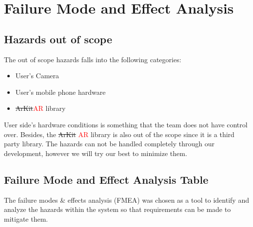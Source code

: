\documentclass{article}
\begin{document}
\section{Failure Mode and Effect Analysis}
\subsection{Hazards out of scope}
The out of scope hazards falls into the following categories:
\begin{itemize}
    \item User's Camera
    \item User's mobile phone hardware
    \item \sout{ArKit}\textcolor{red}{AR} library
\end{itemize}
User side's hardware conditions is something that the team does not have control over. Besides, the \sout{ArKit} \textcolor{red}{AR} library is also out of the scope since it is a third party library. The hazards can not be handled completely through our development, however we will try our best to minimize them.
\subsection{Failure Mode and Effect Analysis Table}
The failure modes \& effects analysis (FMEA) was chosen as a tool to identify and analyze the hazards within the system so that requirements can be made to mitigate them.
\end{document}
